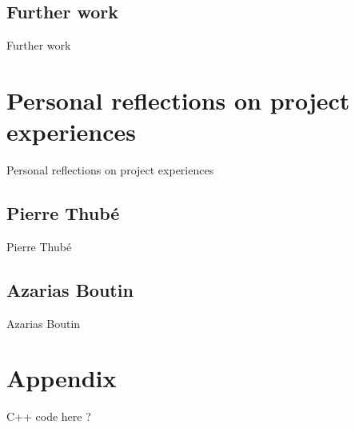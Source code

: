 \documentclass[12pt]{report}
\begin{document}
\chapter{Further work}
Further work

\part{Personal reflections on project experiences}
Personal reflections on project experiences

\chapter{Pierre Thubé}
Pierre Thubé

\chapter{Azarias Boutin}
Azarias Boutin


\part*{Appendix}
C++ code here ?
\end{document}
